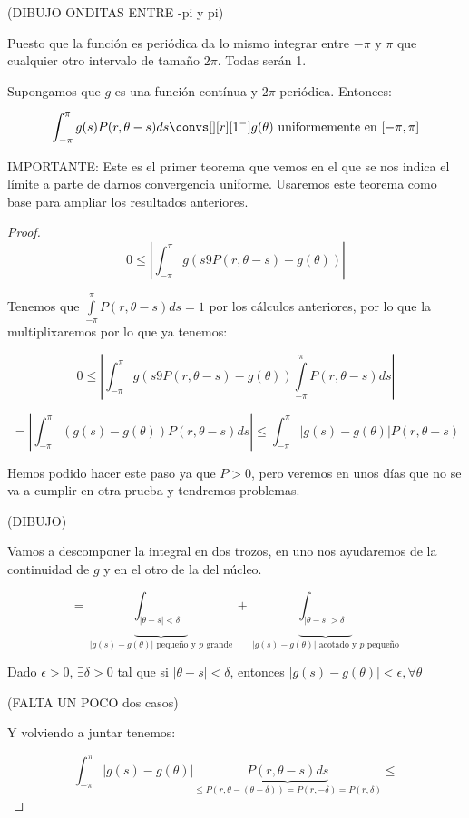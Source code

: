 \begin{itemize}
			(DIBUJO ONDITAS ENTRE -pi y pi)

			Puesto que la función es periódica da lo mismo integrar entre $-\pi$ y $\pi$ que cualquier otro intervalo de tamaño $2\pi$. Todas serán 1.

			\begin{theorem}
				Supongamos que $g$ es una función contínua y $2\pi$-periódica. Entonces:

				\[ \int^\pi_{-\pi} g(s)P(r, \theta-s) ds \convs[][r][1^-] g(\theta) \text{ uniformemente en } [-\pi,\pi] \]

				IMPORTANTE: Este es el primer teorema que vemos en el que se nos indica el límite a parte de darnos convergencia uniforme. Usaremos este teorema como base para ampliar los resultados anteriores.

				\begin{proof}

					\[0 \leq \left| \int_{-\pi}^{\pi} g(s9 P(r, \theta-s) - g(\theta))  \right| \]

					Tenemos que $\int\limits_{-\pi}^{\pi} P(r, \theta-s) ds = 1$ por los cálculos anteriores, por lo que la multiplixaremos por lo que ya tenemos:

					\[0 \leq \left| \int_{-\pi}^{\pi} g(s9 P(r, \theta-s) - g(\theta))  \int\limits_{-\pi}^{\pi} P(r, \theta-s) ds  \right| \]

					\[ = \left| \int_{-\pi}^\pi (g(s) - g(\theta)) P(r, \theta - s) ds \right|  \leq \int^{\pi}_{-\pi} | g(s) - g(\theta) | P(r, \theta- s) \]

					Hemos podido hacer este paso ya que $P>0$, pero veremos en unos días que no se va a cumplir en otra prueba y tendremos problemas.


					(DIBUJO)

					Vamos a descomponer la integral en dos trozos, en uno nos ayudaremos de la continuidad de $g$ y en el otro de la del núcleo.

					\[ = \underbrace{\int_{|\theta-s|< \delta}}_{|g(s) - g(\theta)| \text{ pequeño y }p\text{ grande}} + \underbrace{\int_{|\theta-s| > \delta}}_{|g(s) - g(\theta)| \text{ acotado y }p\text{ pequeño}} \]

					Dado $\epsilon > 0$, $\exists \delta > 0$ tal que si $|\theta-s| < \delta$, entonces $|g(s) - g(\theta)| < \epsilon, \forall \theta$

					(FALTA UN POCO dos casos)

					Y volviendo a juntar tenemos:

					\[ \int^{\pi}_{-\pi} |g(s) - g(\theta) | \underbrace{P(r, \theta-s) ds}_{\leq P(r, \theta-(\theta-\delta)) = P(r, -\delta) = P(r, \delta)} \leq   \]


\end{proof}
\end{theorem}
\end{itemize}
